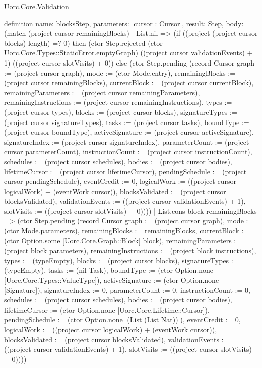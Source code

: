 \begin{lexlean}{Uorc.Core.Validation}
\begin{semanticmodule}
definition{
  name: blocksStep,
  parameters: [cursor : Cursor],
  result: Step,
  body: (match (project cursor remainingBlocks)
    | List.nil => (if ((project (project cursor blocks) length) =? 0) then (ctor Step.rejected (ctor Uorc.Core.Types::StaticError.emptyGraph) ((project cursor validationEvents) + 1) ((project cursor slotVisits) + 0)) else (ctor Step.pending (record Cursor {graph := (project cursor graph), mode := (ctor Mode.entry), remainingBlocks := (project cursor remainingBlocks), currentBlock := (project cursor currentBlock), remainingParameters := (project cursor remainingParameters), remainingInstructions := (project cursor remainingInstructions), types := (project cursor types), blocks := (project cursor blocks), signatureTypes := (project cursor signatureTypes), tasks := (project cursor tasks), boundType := (project cursor boundType), activeSignature := (project cursor activeSignature), signatureIndex := (project cursor signatureIndex), parameterCount := (project cursor parameterCount), instructionCount := (project cursor instructionCount), schedules := (project cursor schedules), bodies := (project cursor bodies), lifetimeCursor := (project cursor lifetimeCursor), pendingSchedule := (project cursor pendingSchedule), eventCredit := 0, logicalWork := ((project cursor logicalWork) + (eventWork cursor)), blocksValidated := (project cursor blocksValidated), validationEvents := ((project cursor validationEvents) + 1), slotVisits := ((project cursor slotVisits) + 0)})))
    | List.cons block remainingBlocks => (ctor Step.pending (record Cursor {graph := (project cursor graph), mode := (ctor Mode.parameters), remainingBlocks := remainingBlocks, currentBlock := (ctor Option.some [Uorc.Core.Graph::Block] block), remainingParameters := (project block parameters), remainingInstructions := (project block instructions), types := (typeEmpty), blocks := (project cursor blocks), signatureTypes := (typeEmpty), tasks := (nil Task), boundType := (ctor Option.none [Uorc.Core.Types::ValueType]), activeSignature := (ctor Option.none [Signature]), signatureIndex := 0, parameterCount := 0, instructionCount := 0, schedules := (project cursor schedules), bodies := (project cursor bodies), lifetimeCursor := (ctor Option.none [Uorc.Core.Lifetime::Cursor]), pendingSchedule := (ctor Option.none [(List (List Nat))]), eventCredit := 0, logicalWork := ((project cursor logicalWork) + (eventWork cursor)), blocksValidated := (project cursor blocksValidated), validationEvents := ((project cursor validationEvents) + 1), slotVisits := ((project cursor slotVisits) + 0)})))
}


\end{semanticmodule}
\end{lexlean}
